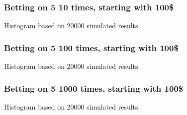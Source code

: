 \documentclass[handout]{beamer}
\begin{document}
   \begin{frame}
   \frametitle{Betting on {\color{red} 5} 10 times, starting with 100\$}
   \begin{center}
   \end{center}
   Histogram based on 20000 simulated results.
   \end{frame}



   \begin{frame}
   \frametitle{Betting on {\color{red} 5} 100 times, starting with 100\$}
   \begin{center}
   \end{center}
   Histogram based on 20000 simulated results.
   \end{frame}



   \begin{frame}
   \frametitle{Betting on {\color{red} 5} 1000 times, starting with 100\$}
   \begin{center}
   \end{center}
   Histogram based on 20000 simulated results.
   \end{frame}


   \begin{frame} 

   \end{frame}

   
\end{document}
